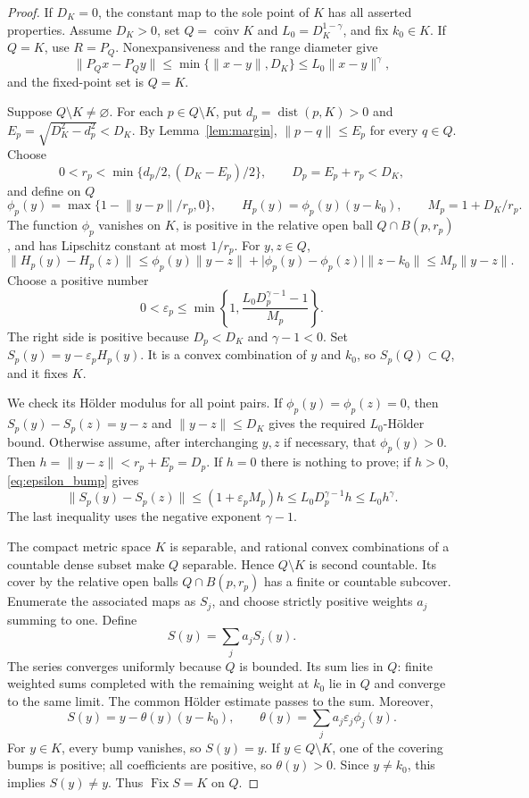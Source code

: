 \documentclass[11pt]{article}
\numberwithin{equation}{section}
\theoremstyle{definition}
\theoremstyle{remark}
\newcommand{\dist}{\operatorname{dist}}
\newcommand{\Fix}{\operatorname{Fix}}
\newcommand{\conv}{\operatorname{conv}}
\newcommand{\norm}[1]{\lVert #1\rVert}
\newcommand{\abs}[1]{\lvert #1\rvert}
\newcommand{\eps}{\varepsilon}
\begin{document}
\begin{proof}
If $D_K=0$, the constant map to the sole point of $K$ has all asserted
properties. Assume $D_K>0$, set $Q=\overline{\conv}K$ and
$L_0=D_K^{1-\gamma}$, and fix $k_0\in K$.
If $Q=K$, use $R=P_Q$. Nonexpansiveness and the range diameter give
\[
 \norm{P_Qx-P_Qy}\le\min\{\norm{x-y},D_K\}
 \le L_0\norm{x-y}^\gamma,
\]
and the fixed-point set is $Q=K$.

Suppose $Q\setminus K\ne\varnothing$. For each $p\in Q\setminus K$,
put $d_p=\dist(p,K)>0$ and $E_p=\sqrt{D_K^2-d_p^2}<D_K$. By
Lemma~\ref{lem:margin}, $\norm{p-q}\le E_p$ for every $q\in Q$.
Choose
\[
 0<r_p<\min\{d_p/2,(D_K-E_p)/2\},\qquad D_p=E_p+r_p<D_K,
\]
and define on $Q$
\[
 \phi_p(y)=\max\{1-\norm{y-p}/r_p,0\},\qquad
 H_p(y)=\phi_p(y)(y-k_0),\qquad M_p=1+D_K/r_p.
\]
The function $\phi_p$ vanishes on $K$, is positive in the relative open
ball $Q\cap B(p,r_p)$, and has Lipschitz constant at most $1/r_p$.
For $y,z\in Q$,
\[
 \norm{H_p(y)-H_p(z)}
 \le\phi_p(y)\norm{y-z}
       +\abs{\phi_p(y)-\phi_p(z)}\norm{z-k_0}
 \le M_p\norm{y-z}.
\]
Choose a positive number
\begin{equation}\label{eq:epsilon_bump}
 0<\eps_p\le
 \min\left\{1,\frac{L_0D_p^{\gamma-1}-1}{M_p}\right\}.
\end{equation}
The right side is positive because $D_p<D_K$ and $\gamma-1<0$.
Set $S_p(y)=y-\eps_p H_p(y)$. It is a convex combination of $y$ and
$k_0$, so $S_p(Q)\subset Q$, and it fixes $K$.

We check its H\"older modulus for all point pairs. If
$\phi_p(y)=\phi_p(z)=0$, then $S_p(y)-S_p(z)=y-z$ and
$\norm{y-z}\le D_K$ gives the required $L_0$-H\"older bound. Otherwise
assume, after interchanging $y,z$ if necessary, that $\phi_p(y)>0$.
Then $h=\norm{y-z}<r_p+E_p=D_p$. If $h=0$ there is nothing to prove;
if $h>0$, \eqref{eq:epsilon_bump} gives
\[
 \norm{S_p(y)-S_p(z)}
 \le(1+\eps_p M_p)h
 \le L_0D_p^{\gamma-1}h
 \le L_0h^\gamma.
\]
The last inequality uses the negative exponent $\gamma-1$.

The compact metric space $K$ is separable, and rational convex
combinations of a countable dense subset make $Q$ separable. Hence
$Q\setminus K$ is second countable. Its cover by the relative open
balls $Q\cap B(p,r_p)$ has a finite or countable subcover. Enumerate the
associated maps as $S_j$, and choose strictly positive weights $a_j$
summing to one. Define
\[
 S(y)=\sum_j a_jS_j(y).
\]
The series converges uniformly because $Q$ is bounded. Its sum lies in
$Q$: finite weighted sums completed with the remaining weight at $k_0$
lie in $Q$ and converge to the same limit. The common H\"older estimate
passes to the sum. Moreover,
\[
 S(y)=y-\theta(y)(y-k_0),\qquad
 \theta(y)=\sum_j a_j\eps_j\phi_j(y).
\]
For $y\in K$, every bump vanishes, so $S(y)=y$. If $y\in Q\setminus K$,
one of the covering bumps is positive; all coefficients are positive,
so $\theta(y)>0$. Since $y\ne k_0$, this implies $S(y)\ne y$.
Thus $\Fix S=K$ on $Q$.


\end{proof}
\end{document}
